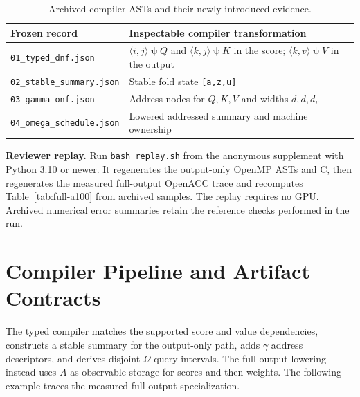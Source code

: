 \documentclass[sigplan,10pt,review,anonymous,balance=false,pbalance=false]{acmart}
\newcommand{\ps}{\mathbin{\psi}}
\begin{document}
\begin{table}[t]
\centering\footnotesize
\caption{Archived compiler ASTs and their newly introduced evidence.}\label{tab:actual-asts}
\begin{tabular}{@{}p{}p{}@{}}\toprule
Frozen record & Inspectable compiler transformation \\\midrule
\texttt{01\_typed\_dnf.json} & $\langle i,j\rangle\ps Q$ and $\langle k,j\rangle\ps K$ in the score; $\langle k,v\rangle\ps V$ in the output \\
\texttt{02\_stable\_summary.json} & Stable fold state \texttt{[a,z,u]} \\
\texttt{03\_gamma\_onf.json} & Address nodes for $Q,K,V$ and widths $d,d,d_v$ \\
\texttt{04\_omega\_schedule.json} & Lowered addressed summary and machine ownership \\\bottomrule
\end{tabular}
\end{table}

\noindent\textbf{Reviewer replay.} Run \nolinkurl{bash replay.sh} from the anonymous supplement with Python 3.10 or newer. It regenerates the output-only OpenMP ASTs and C, then regenerates the measured full-output OpenACC trace and recomputes Table~\ref{tab:full-a100} from archived samples. The replay requires no GPU. Archived numerical error summaries retain the reference checks performed in the run.

\section{Compiler Pipeline and Artifact Contracts}
The typed compiler matches the supported score and value dependencies, constructs a stable summary for the output-only path, adds $\gamma$ address descriptors, and derives disjoint $\Omega$ query intervals. The full-output lowering instead uses $A$ as observable storage for scores and then weights. The following example traces the measured full-output specialization.
\end{document}
